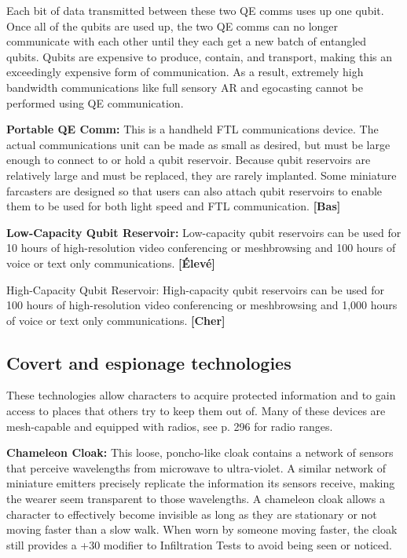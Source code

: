 {{Each bit of data transmitted between these two QE comms uses up one qubit. Once all of the qubits are used up, the two QE comms can no longer communicate with each other until they each get a new batch of entangled qubits. Qubits are expensive to produce, contain, and transport, making this an exceedingly expensive form of communication. As a result, extremely high bandwidth communications like full sensory AR and egocasting cannot be performed using QE communication. 

\textbf{Portable QE Comm:} This is a handheld FTL communications device. The actual communications unit can be made as small as desired, but must be large enough to connect to or hold a qubit reservoir. Because qubit reservoirs are relatively large and must be replaced, they are rarely implanted. Some miniature farcasters are designed so that users can also attach qubit reservoirs to enable them to be used for both light speed and FTL communication. \textbf{[Bas]} 

\textbf{Low-Capacity Qubit Reservoir:} Low-capacity qubit reservoirs can be used for 10 hours of high-resolution video conferencing or meshbrowsing and 100 hours of voice or text only communications. \textbf{[Élevé]} 

High-Capacity Qubit Reservoir: High-capacity qubit reservoirs can be used for 100 hours of high-resolution video conferencing or meshbrowsing and 1,000 hours of voice or text only communications. \textbf{[Cher]} 



\subsection{Covert and espionage technologies} \label{sec:covert-espionage-tech} 

These technologies allow characters to acquire protected information and to gain access to places that others try to keep them out of. Many of these devices are mesh-capable and equipped with radios, see p. 296 for radio ranges. 

\textbf{Chameleon Cloak:} This loose, poncho-like cloak contains a network of sensors that perceive wavelengths from microwave to ultra-violet. A similar network of miniature emitters precisely replicate the information its sensors receive, making the wearer seem transparent to those wavelengths. A chameleon cloak allows a character to effectively become invisible as long as they are stationary or not moving faster than a slow walk. When worn by someone moving faster, the cloak still provides a +30 modifier to Infiltration Tests to avoid being seen or noticed. 

}}

